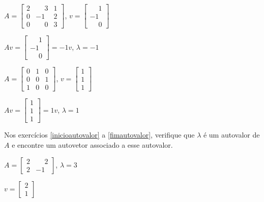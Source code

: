 \documentclass[12pt]{exam}
\begin{document}
\begin{exercicio}
    $A = \begin{bmatrix}2 & \phantom{-}3 & 1\\0 & -1 & 2\\0 & \phantom{-}0 & 3\end{bmatrix}$, $v = \begin{bmatrix}\phantom{-}1\\-1\\\phantom{-}0\end{bmatrix}$
    \begin{solucao}
        $Av = \begin{bmatrix}\phantom{-}1\\-1\\\phantom{-}0\end{bmatrix} = -1v$, $\lambda = -1$
    \end{solucao}
\end{exercicio}

\begin{exercicio}\label{fimautovetor}
    $A = \begin{bmatrix}0 & 1 & 0\\0 & 0 & 1\\1 & 0 & 0\end{bmatrix}$, $v = \begin{bmatrix}1\\1\\1\end{bmatrix}$
    \begin{solucao}
        $Av = \begin{bmatrix}1\\1\\1\end{bmatrix} = 1v$, $\lambda = 1$
    \end{solucao}
\end{exercicio}

Nos exercícios \eqref{inicioautovalor} a \eqref{fimautovalor}, verifique que $\lambda$ é um autovalor de $A$ e encontre um autovetor associado a esse autovalor.

\begin{exercicio}\label{inicioautovalor}
    $A = \begin{bmatrix}2 & \phantom{-}2\\2 & -1\end{bmatrix}$, $\lambda = 3$
    \begin{solucao}
        $v = \begin{bmatrix}2\\1\end{bmatrix}$
    \end{solucao}
\end{exercicio}
\end{document}
